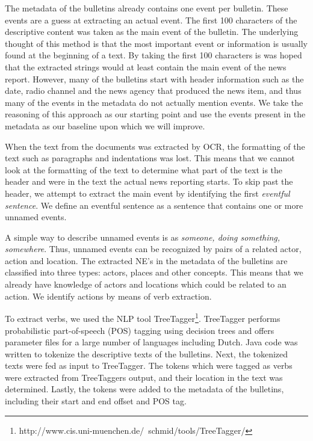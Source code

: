 \documentclass[a4paper, 10pt, conference]{ieeeconf}      %
\begin{document}
The metadata of the bulletins already contains one event per bulletin. These events are a guess at extracting an actual event. The first 100 characters of the descriptive content was taken as the main event of the bulletin. The underlying thought of this method is that the most important event or information is usually found at the beginning of a text. By taking the first 100 characters is was hoped that the extracted strings would at least contain the main event of the news report. However, many of the bulletins start with header information such as the date, radio channel and the news agency that produced the news item, and thus many of the events in the metadata do not actually mention events. We take the reasoning of this approach as our starting point and use the events present in the metadata as our baseline upon which we will improve.

When the text from the documents was extracted by OCR, the formatting of the text such as paragraphs and indentations was lost. This means that we cannot look at the formatting of the text to determine what part of the text is the header and were in the text the actual news reporting starts. To skip past the header, we attempt to extract the main event by identifying the first \textit{eventful sentence}. We define an eventful sentence as a sentence that contains one or more unnamed events.

A simple way to describe unnamed events is as \textit{someone, doing something, somewhere}. Thus, unnamed events can be recognized by pairs of a related actor, action and location. The extracted NE's in the metadata of the bulletins are classified into three types: actors, places and other concepts. This means that we already have knowledge of actors and locations which could be related to an action. We identify actions by means of verb extraction. 

To extract verbs, we used the NLP tool TreeTagger\footnote{http://www.cis.uni-muenchen.de/~schmid/tools/TreeTagger/}. TreeTagger performs probabilistic part-of-speech (POS) tagging using decision trees\cite{schmid2013treetagger} and offers parameter files for a large number of languages including Dutch. Java code was written to tokenize the descriptive texts of the bulletins. Next, the tokenized texts were fed as input to TreeTagger. The tokens which were tagged as verbs were extracted from TreeTaggers output, and their location in the text was determined. Lastly, the tokens were added to the metadata of the bulletins, including their start and end offset and POS tag.
\end{document}
